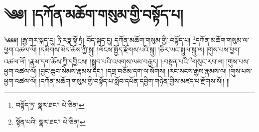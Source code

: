 \setcounter{footnote}{0} 
\chapter{༄༅། །དཀོན་མཆོག་གསུམ་གྱི་བསྟོད་པ།}༄༅༅། །རྒྱ་གར་སྐད་དུ། ཏྲི་རཏྣ་སྟོ་ཏྲཾ། བོད་སྐད་དུ། དཀོན་མཆོག་གསུམ་གྱི་:བསྟོད་པ། \footnote{བསྟོད་ཏྲ་  སྣར་ཐང་།  པེ་ཅིན། }དཀོན་མཆོག་གསུམ་ལ་ཕྱག་འཚལ་ལོ། །དམིགས་མེད་ཆོས་ཀྱི་སྐུ། །ལོངས་སྤྱོད་རྫོགས་པའི་སྐུ། །ཅིར་ཡང་སྤྲུལ་སྐུ་ལ། །གུས་པས་ཕྱག་འཚལ་ལོ། །རྣམ་དག་ཆོས་ཀྱི་དབྱིངས། །སྒྲུབ་པའི་འཕགས་ལམ་བརྒྱད། །:བསྟན་པའི་\footnote{སྟོན་པའི་  སྣར་ཐང་།  པེ་ཅིན། }གསུང་རབ་ལ། །གུས་པས་ཕྱག་འཚལ་ལོ། །བྱང་ཆུབ་སེམས་རྣམས་དང་། །དགྲ་བཅོམ་དག་ལ་སོགས། །རང་སངས་རྒྱས་རྣམས་ལ། །གུས་པས་ཕྱག་འཚལ་ལོ། །དཀོན་མཆོག་གསུམ་གྱི་བསྟོད་པ་སློབ་དཔོན་དབྱིག་གཉེན་གྱིས་མཛད་པ་རྫོགས་སོ།། །།